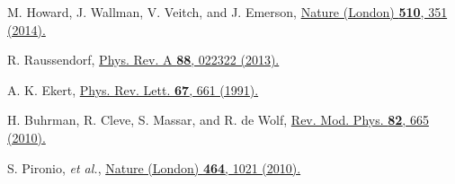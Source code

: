 \documentclass[prl,letterpaper,english,reprint,nofootinbib,aps,superscriptaddress,showpacs,showkeys]{revtex4-1}
\theoremstyle{definition}
\theoremstyle{remark}
\begin{document}
\begin{thebibliography}{10}

 M. Howard, J. Wallman, V. Veitch, and J. Emerson,
\href{https://www.nature.com/articles/nature13460}
{Nature (London) \textbf{510}, 351 (2014).}




 R. Raussendorf,
 \href{http://link.aps.org/doi/10.1103/PhysRevA.88.022322}{Phys. Rev. A \textbf{88}, 022322 (2013).}




 A. K. Ekert,
 \href{http://journals.aps.org/prl/abstract/10.1103/PhysRevLett.67.661}{Phys. Rev. Lett. \textbf{67}, 661 (1991).}

%
%

 H. Buhrman, R. Cleve, S. Massar, and R. de Wolf,
 \href{http://journals.aps.org/rmp/abstract/10.1103/RevModPhys.82.665}{Rev. Mod. Phys. \textbf{82}, 665 (2010).}


 S. Pironio, \emph{et al.},
 \href{http://www.nature.com/nature/journal/v464/n7291/full/nature09008.html}{Nature (London) \textbf{464}, 1021 (2010).}



\end{thebibliography}
\end{document}

